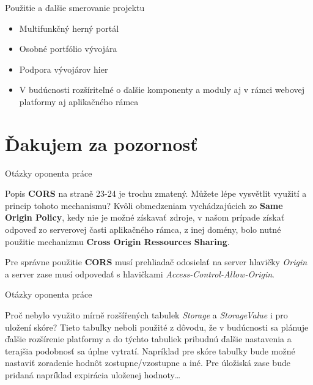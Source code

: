 \documentclass[10pt]{beamer}
\begin{document}
\begin{frame}[fragile]{Použitie a ďalšie smerovanie projektu}
    \begin{itemize}
        \item Multifunkčný herný portál
        \item Osobné portfólio vývojára
        \item Podpora vývojárov hier
        \item V budúcnosti rozšíriteľné o ďalšie komponenty a moduly aj v rámci webovej platformy aj aplikačného rámca
    \end{itemize}
\end{frame}

\section{Ďakujem za pozornosť}

\begin{frame}[fragile]{Otázky oponenta práce}
    \begin{alertblock}{Popis \textbf{CORS} na straně 23-24 je trochu zmatený. Můžete lépe vysvětlit využití a princip tohoto mechanismu?}
		Kvôli obmedzeniam vychádzajúcich zo \textbf{Same Origin Policy}, kedy nie je možné získavať zdroje, v našom prípade získať odpoveď zo serverovej časti aplikačného rámca,  z inej domény, bolo nutné použitie mechanizmu \textbf{Cross Origin Ressources Sharing}.

        Pre správne použitie \textbf{CORS} musí prehliadač odosielať na server hlavičky \textit{Origin} a server zase musí odpovedať s hlavičkami \textit{Access-Control-Allow-Origin}. 
	\end{alertblock}
\end{frame}

\begin{frame}[fragile]{Otázky oponenta práce}
    \begin{alertblock}{Proč nebylo využito mírně rozšířených tabulek \textit{Storage} a \textit{StorageValue} i pro uložení skóre?}
		Tieto tabuľky neboli použité z dôvodu, že v budúcnosti sa plánuje ďalšie rozšírenie platformy a do týchto tabuliek pribudnú ďalšie nastavenia a terajšia podobnosť sa úplne vytratí. Napríklad pre skóre tabuľky bude možné nastaviť zoradenie hodnôt zostupne/vzostupne a iné. Pre úložiská zase bude pridaná napríklad expirácia uloženej hodnoty… 
	\end{alertblock}
\end{frame}
\end{document}
